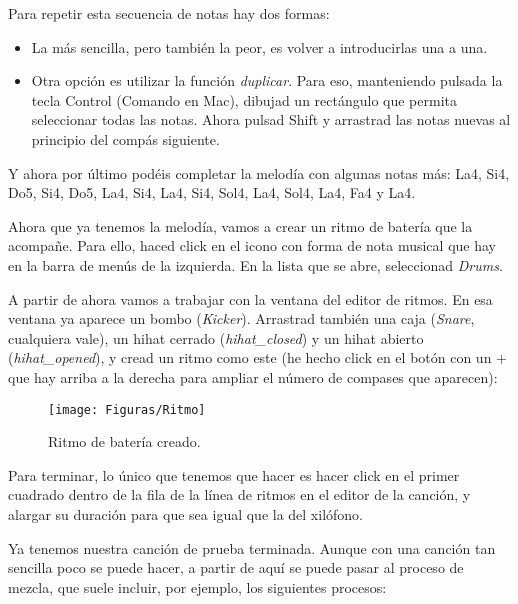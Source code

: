 \documentclass[es,practica]{uah}
\begin{document}
Para repetir esta secuencia de notas hay dos formas:

\begin{itemize}
\item La más sencilla, pero también la peor, es volver a introducirlas una a una. 
\item Otra opción es utilizar la función \emph{duplicar}. Para eso, manteniendo pulsada la tecla Control (Comando en Mac), dibujad un rectángulo que permita seleccionar todas las notas. Ahora pulsad Shift y arrastrad las notas nuevas al principio del compás siguiente. 
\end{itemize}

Y ahora por último podéis completar la melodía con algunas notas más: La4, Si4, Do5, Si4, Do5, La4, Si4, La4, Si4, Sol4, La4, Sol4, La4, Fa4 y La4.

Ahora que ya tenemos la melodía, vamos a crear un ritmo de batería que la acompañe. Para ello, haced click en el icono con forma de nota musical que hay en la barra de menús de la izquierda. En la lista que se abre, seleccionad \emph{Drums}.

A partir de ahora vamos a trabajar con la ventana del editor de ritmos. En esa ventana ya aparece un bombo (\emph{Kicker}). Arrastrad también una caja (\emph{Snare}, cualquiera vale), un hihat cerrado (\emph{hihat\_closed}) y un hihat abierto (\emph{hihat\_opened}), y cread un ritmo como este (he hecho click en el botón con un + que hay arriba a la derecha para ampliar el número de compases que aparecen):

\begin{figure}[h!]
  \centering
  \texttt{[image: Figuras/Ritmo]}
  \caption{Ritmo de batería creado.}
\end{figure}

Para terminar, lo único que tenemos que hacer es hacer click en el primer cuadrado dentro de la fila de la línea de ritmos en el editor de la canción, y alargar su duración para que sea igual que la del xilófono.

Ya tenemos nuestra canción de prueba terminada. Aunque con una canción tan sencilla poco se puede hacer, a partir de aquí se puede pasar al proceso de mezcla, que suele incluir, por ejemplo, los siguientes procesos:
\end{document}
